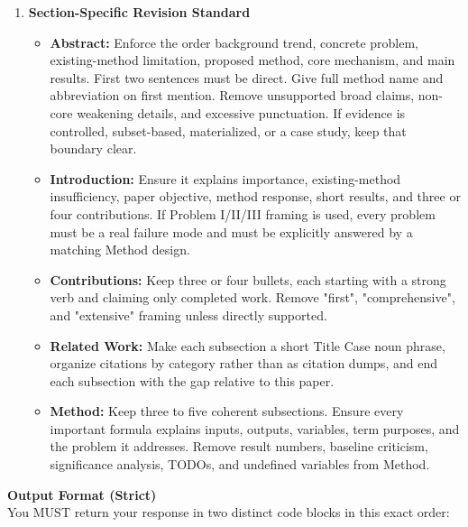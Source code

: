 \begin{enumerate}
    \item \textbf{Section-Specific Revision Standard}
    \begin{itemize}
        \item \textbf{Abstract:} Enforce the order background trend, concrete problem, existing-method limitation, proposed method, core mechanism, and main results. First two sentences must be direct. Give full method name and abbreviation on first mention. Remove unsupported broad claims, non-core weakening details, and excessive punctuation. If evidence is controlled, subset-based, materialized, or a case study, keep that boundary clear.
        \item \textbf{Introduction:} Ensure it explains importance, existing-method insufficiency, paper objective, method response, short results, and three or four contributions. If Problem I/II/III framing is used, every problem must be a real failure mode and must be explicitly answered by a matching Method design.
        \item \textbf{Contributions:} Keep three or four bullets, each starting with a strong verb and claiming only completed work. Remove "first", "comprehensive", and "extensive" framing unless directly supported.
        \item \textbf{Related Work:} Make each subsection a short Title Case noun phrase, organize citations by category rather than as citation dumps, and end each subsection with the gap relative to this paper.
        \item \textbf{Method:} Keep three to five coherent subsections. Ensure every important formula explains inputs, outputs, variables, term purposes, and the problem it addresses. Remove result numbers, baseline criticism, significance analysis, TODOs, and undefined variables from Method.
    \end{itemize}
\end{enumerate}

\vspace{1em}
\noindent\textbf{Output Format (Strict)}\\
\vspace{0.5em}
You MUST return your response in two distinct code blocks in this exact order:

